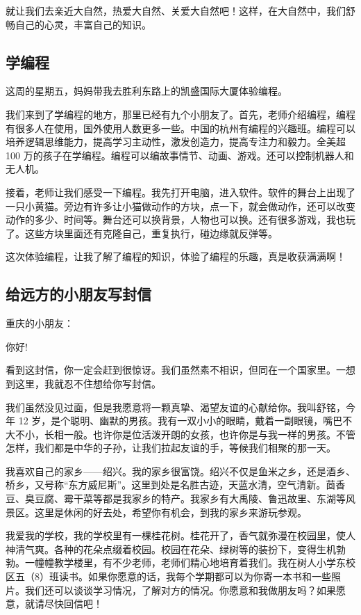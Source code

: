 \documentclass[UTF8,a4paper,titlepage,twoside,10.5pt]{article}
\begin{document}
就让我们去亲近大自然，热爱大自然、关爱大自然吧！这样，在大自然中，我们舒畅自己的心灵，丰富自己的知识。

\subsection{学编程}
\label{sec:orgc1525e9}

这周的星期五，妈妈带我去胜利东路上的凯盛国际大厦体验编程。

我们来到了学编程的地方，那里已经有九个小朋友了。首先，老师介绍编程，编程有很多人在使用，国外使用人数更多一些。中国的杭州有编程的兴趣班。编程可以培养逻辑思维能力，提高学习主动性，激发创造力，提高专注力和毅力。全美超 100 万的孩子在学编程。编程可以编故事情节、动画、游戏。还可以控制机器人和无人机。

接着，老师让我们感受一下编程。我先打开电脑，进入软件。软件的舞台上出现了一只小黄猫。旁边有许多让小猫做动作的方块，点一下，就会做动作，还可以改变动作的多少、时间等。舞台还可以换背景，人物也可以换。还有很多游戏，我也玩了。这些方块里面还有克隆自己，重复执行，碰边缘就反弹等。

这次体验编程，让我了解了编程的知识，体验了编程的乐趣，真是收获满满啊！

\subsection{给远方的小朋友写封信}
\label{sec:org59f7b89}

\noindent
重庆的小朋友：

你好!

看到这封信，你一定会赶到很惊讶。我们虽然素不相识，但同在一个国家里。一想到这里，我就忍不住想给你写封信。

我们虽然没见过面，但是我愿意将一颗真挚、渴望友谊的心献给你。我叫舒铭，今年 12 岁，是个聪明、幽默的男孩。我有一双小小的眼睛，戴着一副眼镜，嘴巴不大不小，长相一般。也许你是位活泼开朗的女孩，也许你是与我一样的男孩。不管怎样，我们都是中华的子孙，让我们拉起友谊的手，等候我们相聚的那一天。

我喜欢自己的家乡——绍兴。我的家乡很富饶。绍兴不仅是鱼米之乡，还是酒乡、桥乡，又号称“东方威尼斯”。这里到处是名胜古迹，天蓝水清，空气清新。茴香豆、臭豆腐、霉干菜等都是我家乡的特产。我家乡有大禹陵、鲁迅故里、东湖等风景区。这里是休闲的好去处，希望你有机会，到我的家乡来游玩参观。

我爱我的学校，我的学校里有一棵桂花树。桂花开了，香气就弥漫在校园里，使人神清气爽。各种的花朵点缀着校园。校园在花朵、绿树等的装扮下，变得生机勃勃。一幢幢教学楼里，有不少老师，老师们精心地培育着我们。我在树人小学东校区五（8）班读书。如果你愿意的话，我每个学期都可以为你寄一本书和一些照片。我们还可以谈谈学习情况，了解对方的情况。你愿意和我做朋友吗？如果愿意，就请尽快回信吧！
\end{document}
